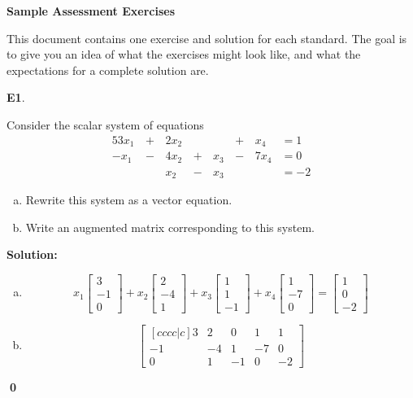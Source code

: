\documentclass{article}
\newenvironment{problem}[1]
{
  \begin{flushleft}
  \textbf{#1}.
  \ignorespaces
}
{
  \end{flushleft}
}
\newenvironment{solution}
{
  \ignorespaces
  \textbf{Solution:}
}
{
  \ignorespacesafterend
  \begin{flushright}
  {\bfseries \qed}
  \end{flushright}
}
\begin{document}
\begin{center}
\Large \textbf{Sample Assessment Exercises}
\end{center}

This document contains one exercise and solution for each standard.
The goal is to give you an idea of what the exercises might look like,
and what the expectations for a complete solution are.

\begin{problem}{E1}
Consider the scalar system of equations 
\begin{alignat*}{5}
3x_1 &\,+\,& 2x_2 &\,\,& &\,+\,&x_4 &= 1 \\
-x_1 &\,-\,& 4x_2 &\,+\,&x_3&\,-\,&7x_4 &= 0 \\
&\,\,& x_2 &\,-\,&x_3 &\,\,&  &= -2
\end{alignat*}
\begin{enumerate}[(a)]
\item Rewrite this system as a vector equation.
\item Write an augmented matrix corresponding to this system.
\end{enumerate}
\end{problem}
\begin{solution}
\begin{enumerate}[(a)]
\item
\[ x_1\begin{bmatrix} 3 \\ -1 \\ 0 \end{bmatrix} + x_2 \begin{bmatrix}2 \\ -4 \\ 1 \end{bmatrix}+x_3 \begin{bmatrix} 1 \\ 1 \\ -1 \end{bmatrix} + x_4 \begin{bmatrix} 1 \\ -7 \\ 0 \end{bmatrix} = \begin{bmatrix} 1 \\ 0 \\ -2 \end{bmatrix} \]
\item \[
\begin{bmatrix}[cccc|c]
3 & 2 & 0 & 1 & 1 \\
-1 & -4 & 1 & -7 & 0 \\
0 & 1 & -1 & 0 & -2
\end{bmatrix}
\]
\end{enumerate}
\end{solution}
\end{document}
